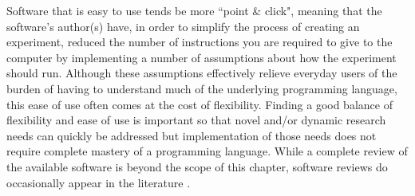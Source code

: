 \begin{figure}
\begin{tcolorbox}[every float=\centering, drop shadow, title=Trade off between Flexibility and Ease of Use ,colback=WMgold,colframe=WMgreen,
  colbacktitle=WMgreen,]
  \label{fig:ExpCtrlApps}
 \end{tcolorbox}
 \end{figure}
 
Software that is easy to use tends be more ``point \& click", meaning that the software's author(s) have, in order to simplify the process of creating an experiment, reduced the number of instructions you are required to give to the computer by implementing a number of assumptions about how the experiment should run.  Although these assumptions effectively relieve everyday users of the burden of having to understand much of the underlying programming language, this ease of use often comes at the cost of flexibility. Finding a good balance of flexibility and ease of use is important so that novel and/or dynamic research needs can quickly be addressed but implementation of those needs does not require complete mastery of a programming language. While a complete review of the available software is beyond the scope of this chapter, software reviews do occasionally appear in the literature \citep[e.g.,~][]{stahl2006software}.


